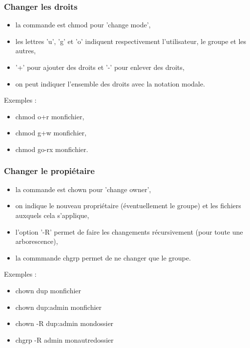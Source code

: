 \documentclass[handout,10pt]{beamer}
\begin{document}
\frame
{
    \frametitle{Changer les droits}

    \begin{itemize}
        \item la commande est {\ttfamily chmod} pour 'change mode',
        \item les lettres 'u', 'g' et 'o' indiquent respectivement l'utilisateur, le groupe et les autres,
        \item '+' pour ajouter des droits et '-' pour enlever des droits,
        \item on peut indiquer l'ensemble des droits avec la notation modale.
    \end{itemize}

    Exemples :

    \begin{itemize}
        \item {\ttfamily chmod o+r monfichier},
        \item {\ttfamily chmod g+w monfichier},
        \item {\ttfamily chmod go-rx monfichier}.
    \end{itemize}
}


\frame
{
    \frametitle{Changer le propiétaire}

    \begin{itemize}
        \item la commande est {\ttfamily chown} pour 'change owner',
        \item on indique le nouveau propriétaire (éventuellement le groupe) et les fichiers auxquels cela s'applique,
        \item l'option '-R' permet de faire les changements récursivement (pour toute une arborescence),
        \item la commmande {\ttfamily chgrp} permet de ne changer que le groupe.
    \end{itemize}

    Exemples :

    \NoAutoSpaceBeforeFDP
    \begin{itemize}
        \item {\ttfamily chown dup monfichier}
        \item {\ttfamily chown dup:admin monfichier}
        \item {\ttfamily chown -R dup:admin mondossier}
        \item {\ttfamily chgrp -R admin monautredossier}
    \end{itemize}
    \AutoSpaceBeforeFDP
}
\end{document}
